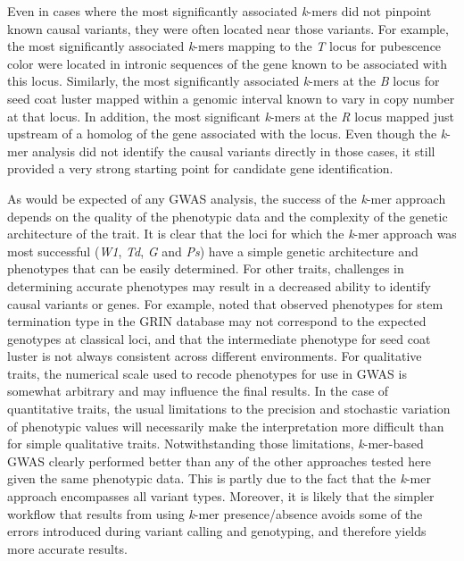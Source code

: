 \documentclass{article}
\begin{document}
Even in cases where the most significantly associated \emph{k}-mers did not
pinpoint known causal variants, they were often located near those variants.
For example, the most significantly associated \emph{k}-mers mapping to the
\emph{T} locus for pubescence color were located in intronic sequences of the
gene known to be associated with this locus.  Similarly, the most significantly
associated \emph{k}-mers at the \emph{B} locus for seed coat luster mapped
within a genomic interval known to vary in copy number at that locus. In
addition, the most significant \emph{k}-mers at the \emph{R} locus mapped just
upstream of a homolog of the gene associated with the locus. Even though the
\emph{k}-mer analysis did not identify the causal variants directly in those
cases, it still provided a very strong starting point for candidate gene
identification.

As would be expected of any GWAS analysis, the success of the \emph{k}-mer approach
depends on the quality of the phenotypic data and the complexity of the genetic
architecture of the trait. It is clear that the loci for which the
\emph{k}-mer approach was most successful (\emph{W1}, \emph{Td}, \emph{G} and
\emph{Ps}) have a simple genetic architecture and phenotypes that can be easily
determined. For other traits, challenges in determining accurate phenotypes may
result in a decreased ability to identify causal variants or genes. For
example,  noted that observed phenotypes for stem
termination type in the GRIN database may not correspond to the expected
genotypes at classical loci, and that the intermediate phenotype for seed coat
luster is not always consistent across different environments. For qualitative
traits, the numerical scale used to recode phenotypes for use in GWAS is somewhat
arbitrary and may influence the final results. In the case of quantitative
traits, the usual limitations to the precision and stochastic variation of
phenotypic values will necessarily make the interpretation more difficult than
for simple qualitative traits. Notwithstanding those limitations,
\textit{k}-mer-based GWAS clearly performed better than any of the other
approaches tested here given the same phenotypic data. This is partly due
to the fact that the \textit{k}-mer approach encompasses all variant types.
Moreover, it is likely that the simpler workflow that results from using
\textit{k}-mer presence/absence avoids some of the errors introduced during
variant calling and genotyping, and therefore yields more accurate results.
\end{document}
